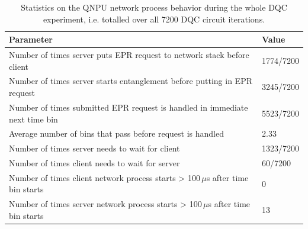 \begin{table}[t]
    \centering
    \begin{tabular}{|l|l|}
    \hline
    \textbf{Parameter} & \textbf{Value} \\ 
    \hline
    Number of times server puts \ac{EPR} request to network stack before client & 1774/7200 \\
    Number of times server starts entanglement before putting in \ac{EPR} request & 3245/7200 \\
    Number of times submitted \ac{EPR} request is handled in immediate next time bin & 5523/7200 \\
    Average number of bins that pass before request is handled & 2.33 \\
    Number of times server needs to wait for client & 1323/7200 \\
    Number of times client needs to wait for server & 60/7200 \\
    Number of times client network process starts > 100\,$\mu$s after time bin starts & 0 \\
    Number of times server network process starts > 100\,$\mu$s after time bin starts & 13 \\
    \hline
    \end{tabular}
    \caption{Statistics on the \ac{QNPU} network process behavior during the whole \ac{DQC} experiment, i.e. totalled over all 7200 \ac{DQC} circuit iterations.}
    \label{tab:network_process_stats}
\end{table}